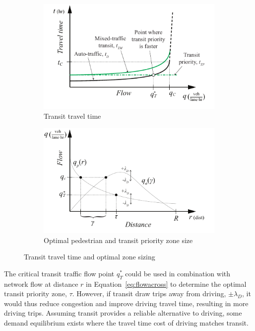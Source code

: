 \documentclass{article}
\begin{document}
\begin{figure}[!ht]
     \centering
     \hfill
     \begin{subfigure}[b]{0.45\textwidth}
         \centering
         \includegraphics[width=\textwidth]{diagram_transit_traveltime}
        \caption{Transit travel time}
         \label{fig:transittraveltime}
     \end{subfigure}
     \hfill
     \begin{subfigure}[b]{0.45\textwidth}
         \centering
         \includegraphics[width=\textwidth]{diagram_flow_combo}
         \caption{Optimal pedestrian and transit priority zone size}
         \label{fig:flowcombo}
     \end{subfigure}
     \hfill
     \caption{Transit travel time and optimal zone sizing}
\end{figure}

The critical transit traffic flow point $q^*_T$ could be used in combination with network flow at distance $r$ in Equation~\eqref{eq:flowacross} to determine the optimal transit priority zone, $\tau$. However, if transit draw trips away from driving, $\pm \lambda_D$, it would thus reduce congestion and improve driving travel time, resulting in more driving trips. Assuming transit provides a reliable alternative to driving, some demand equilibrium exists where the travel time cost of driving matches transit.
\end{document}
